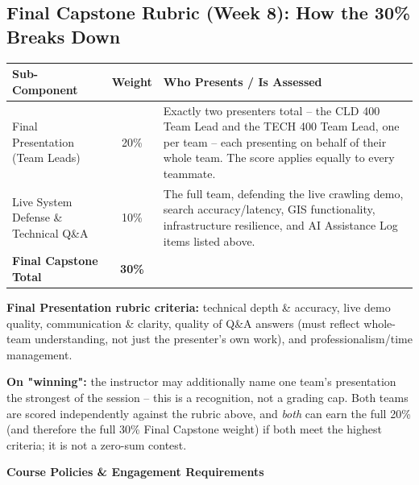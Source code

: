 \documentclass[10pt, a4paper]{article}
\newcommand{\sectionbar}[1]{%
  \par\vspace{0.7em}
  \refstepcounter{section}%
  \noindent\colorbox{secondary}{\parbox{\dimexpr\textwidth-2\fboxsep\relax}{\centering\color{white}\bfseries\Large #1}}%
  \par\vspace{0.5em}
}
\begin{document}
\subsection*{Final Capstone Rubric (Week 8): How the 30\% Breaks Down}
\begin{table}[H]
\centering
\small
\renewcommand{\arraystretch}{1.3}
\begin{tabularx}{\textwidth}{|X|c|X|}
\hline
\rowcolor{lightgray}
Sub-Component & Weight & Who Presents / Is Assessed \\ \hline
Final Presentation (Team Leads) & 20\% & Exactly two presenters total -- the CLD 400 Team Lead and the TECH 400 Team Lead, one per team -- each presenting on behalf of their whole team. The score applies equally to every teammate. \\ \hline
Live System Defense \& Technical Q\&A & 10\% & The full team, defending the live crawling demo, search accuracy/latency, GIS functionality, infrastructure resilience, and AI Assistance Log items listed above. \\ \hline
\textbf{Final Capstone Total} & \textbf{30\%} & \\ \hline
\end{tabularx}
\end{table}

\textbf{Final Presentation rubric criteria:} technical depth \& accuracy, live demo quality, communication \& clarity, quality of Q\&A answers (must reflect whole-team understanding, not just the presenter's own work), and professionalism/time management.

\textbf{On "winning":} the instructor may additionally name one team's presentation the strongest of the session -- this is a recognition, not a grading cap. Both teams are scored independently against the rubric above, and \emph{both} can earn the full 20\% (and therefore the full 30\% Final Capstone weight) if both meet the highest criteria; it is not a zero-sum contest.

\sectionbar{Course Policies \& Engagement Requirements}
\end{document}
